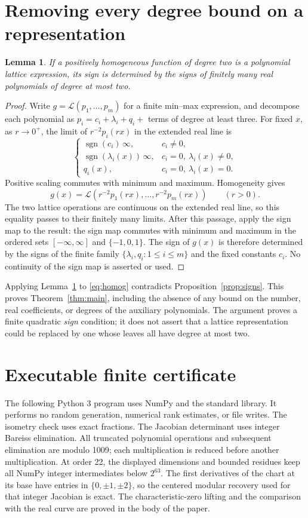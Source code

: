 \documentclass[11pt]{article}
\newtheorem{lemma}[theorem]{Lemma}
\newcommand{\sgn}{\operatorname{sgn}}
\begin{document}
\section{Removing every degree bound on a representation}
\begin{lemma}\label{lem:radial}
If a positively homogeneous function of degree two is a polynomial lattice
expression, its sign is determined by the signs of finitely many real
polynomials of degree at most two.
\end{lemma}
\begin{proof}
Write $g=\mathcal L(p_1,\ldots,p_m)$ for a finite min--max expression,
and decompose each polynomial as
$p_i=c_i+\lambda_i+q_i+$ terms of degree at least three.
For fixed $x$, as $r\to0^+$, the limit of $r^{-2}p_i(rx)$ in the
extended real line is
\[
 \begin{cases}
  \sgn(c_i)\,\infty,&c_i\ne0,\\
  \sgn(\lambda_i(x))\,\infty,&c_i=0,\ \lambda_i(x)\ne0,\\
  q_i(x),&c_i=0,\ \lambda_i(x)=0.
 \end{cases}
\]
Positive scaling commutes with minimum and maximum. Homogeneity gives
\[
 g(x)=\mathcal L(r^{-2}p_1(rx),\ldots,r^{-2}p_m(rx))\qquad(r>0).
\]
The two lattice operations are continuous on the extended real line,
so this equality passes to their finitely many limits. After this passage,
apply the sign map to the result: the sign map commutes with minimum and
maximum in the ordered sets $[-\infty,\infty]$ and $\{-1,0,1\}$.
The sign of $g(x)$ is therefore determined by the signs of the finite
family $\{\lambda_i,q_i:1\leq i\leq m\}$ and the fixed constants $c_i$.
No continuity of the sign map is asserted or used.
\end{proof}

Applying Lemma~\ref{lem:radial} to \eqref{eq:homog} contradicts
Proposition~\ref{prop:signs}. This proves Theorem~\ref{thm:main}, including
the absence of any bound on the number, real coefficients, or degrees of
the auxiliary polynomials. The argument proves a finite quadratic
\emph{sign} condition; it does not assert that a lattice representation
could be replaced by one whose leaves all have degree at most two.

\appendix
\section{Executable finite certificate}\label{app:verifier}
The following Python 3 program uses NumPy and the standard library.
It performs no random generation, numerical rank estimates, or file writes.
The isometry check uses exact fractions. The Jacobian determinant uses
integer Bareiss elimination. All truncated polynomial operations and
subsequent elimination are modulo 1009; each multiplication is reduced
before another multiplication. At order 22, the displayed dimensions and
bounded residues keep all NumPy integer intermediates below $2^{63}$.
The first derivatives of the chart at its base have entries in
$\{0,\pm1,\pm2\}$, so the centered modular recovery used for that
integer Jacobian is exact. The characteristic-zero lifting and the
comparison with the real curve are proved in the body of the paper.
\end{document}
